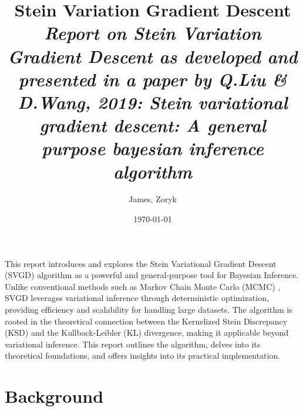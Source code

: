 \documentclass[11pt]{isr} %
\title{{\bf Stein Variation Gradient Descent }\\
{\em Report on Stein Variation Gradient Descent as developed and presented in a paper by Q.Liu \& D.Wang, 2019: Stein variational gradient descent: A general purpose bayesian inference algorithm}} %
\author{James, Zoryk} %
\date{\today} %
\begin{document}
\maketitle %



This report introduces and explores the Stein Variational Gradient Descent (SVGD) algorithm as a powerful and general-purpose tool for Bayesian Inference.
Unlike conventional methods such as Markov Chain Monte Carlo (MCMC) \cite{robert1999monte, gelman1995bayesian}, SVGD leverages variational inference \cite{rezende2016variational} through deterministic optimization, providing efficiency and scalability for handling large datasets.
The algorithm is rooted in the theoretical connection between the Kernelized Stein Discrepancy (KSD) \cite{liu2016kernelized} and the Kullback-Leibler (KL) divergence, making it applicable beyond variational inference.
This report outlines the algorithm, delves into its theoretical foundations, and offers insights into its practical implementation.
\section*{Background}
\end{document}
